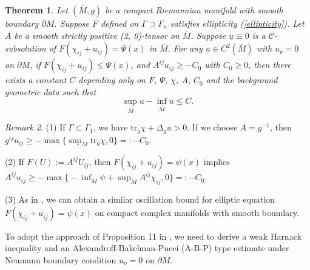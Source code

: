 \documentclass[12pt]{amsart}
\newcommand{\tr}{\mbox{tr}}
\newtheorem{theorem}{Theorem}[section]
\theoremstyle{definition}
\theoremstyle{remark}
\newtheorem{remark}[theorem]{Remark}
\numberwithin{equation}{section}
\begin{document}
\begin{theorem}\label{osc_thm}
	Let $(\overline{M}, g)$ be a compact Riemannian manifold with smooth boundary $\partial M$. 
	Suppose $F$ defined on $\Gamma \supset \Gamma_n$ satisfies ellipticity (\ref{ellipticity}). 
	Let $A$ be a smooth strictly positive (2, 0)-tensor on $\overline{M}$.
	Suppose $\underline{u} \equiv 0$ is a $\mathcal{C}$-subsolution of $F(\chi_{ij} + u_{ij}) = \Psi(x)$ in $\overline{M}$. 
	For any $u \in C^2(\overline{M})$ with $u_\nu = 0$ on $\partial M$, if $F(\chi_{ij} + u_{ij}) \leq \Psi(x)$, and $A^{ij}u_{ij} \geq - C_0$ with $C_0 \geq 0$, then there exists a constant $C$ depending only on $F$, $\Psi$, $\chi$, $A$, $C_0$ and the background geometric data such that
	\begin{equation}
	\sup_{\overline{M}} u - \inf_{\overline{M}} u \leq C.
	\end{equation}
\end{theorem}
\begin{remark}
	(1) If $\Gamma \subset \Gamma_1$, we have $\tr_g \chi + \Delta_g u > 0$. If we choose $A = g^{-1}$, then $g^{ij}u_{ij} \geq - \max\{\sup_{\overline{M}} \tr_g \chi, 0\} =: -C_0$.
	
	(2) If $F(U) := A^{ij}U_{ij}$, then $F(\chi_{ij} + u_{ij}) = \psi(x)$ implies $A^{ij}u_{ij} \geq - \max\big\{ - \inf_{\overline{M}} \psi + \sup_{\overline{M}} A^{ij}\chi_{ij}, 0\big\} =: - C_0$.
	
	(3) As in \cite{Sze15}, we can obtain a similar oscillation bound for elliptic equation $F(\chi_{i\bar{j}} + u_{i\bar{j}}) = \psi(x)$ on compact complex manifolds with smooth boundary.
\end{remark}

To adopt the approach of Proposition 11 in \cite{Sze15}, we need to derive a weak Harnack inequality and an Alexandroff-Bakelman-Pucci (A-B-P) type estimate under Neumann boundary condition $u_\nu = 0$ on $\partial M$.
\end{document}
